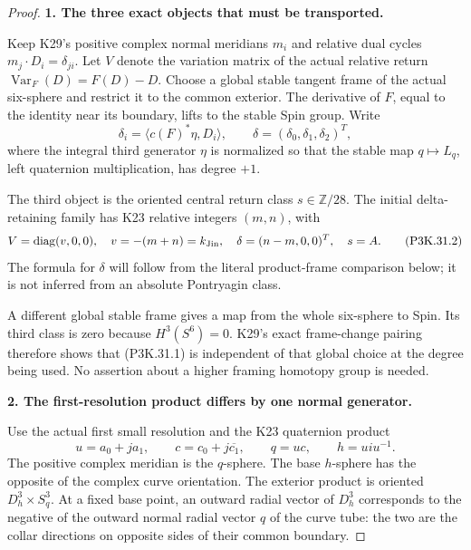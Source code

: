 \begin{proof}
\par\medskip\noindent\textbf{1. The three exact objects that must be transported.}\enspace

Keep K29's positive complex normal meridians \(m_i\) and relative
dual cycles \(m_j\cdot D_i=\delta_{ji}\). Let \(V\) denote the
variation matrix of the actual relative return
\(\operatorname{Var}_F(D)=F(D)-D\). Choose a global stable tangent
frame of the actual six-sphere and restrict it to the common exterior.
The derivative of \(F\), equal to the identity near its boundary,
lifts to the stable Spin group. Write
\[
 \delta_i=\langle c(F)^*\eta,D_i\rangle,\qquad
       \delta=(\delta_0,\delta_1,\delta_2)^T,
                                                        \tag{P3K.31.1}
\]
where the integral third generator \(\eta\) is normalized so that
the stable map \(q\mapsto L_q\), left quaternion multiplication,
has degree \(+1\).

The third object is the oriented central return class \(s\in\mathbb Z/28\).
The initial delta-retaining family has K23 relative integers
\((m,n)\), with
\[
       V=\operatorname{diag}(v,0,0),\quad
       v=-(m+n)=k_{\rm Jin},\quad
       \delta=(n-m,0,0)^T,\quad s=A.
                                                        \tag{P3K.31.2}
\]
The formula for \(\delta\) will follow from the literal product-frame
comparison below; it is not inferred from an absolute Pontryagin class.

A different global stable frame gives a map from the whole six-sphere
to Spin. Its third class is zero because \(H^3(S^6)=0\).
K29's exact frame-change pairing therefore shows that (P3K.31.1) is
independent of that global choice at the degree being used.
No assertion about a higher framing homotopy group is needed.

\par\medskip\noindent\textbf{2. The first-resolution product differs by one normal generator.}\enspace

Use the actual first small resolution and the K23 quaternion product
\[
 u=a_0+j a_1,\qquad
 c=c_0+j\overline{c_1},\qquad
 q=uc,\qquad h=u i u^{-1}.
                                                        \tag{P3K.31.3}
\]
The positive complex meridian is the \(q\)-sphere. The base
\(h\)-sphere has the opposite of the complex curve orientation.
The exterior product is oriented \(D^3_h\times S^3_q\).
At a fixed base point, an outward radial vector of \(D^3_h\)
corresponds to the negative of the outward normal radial
vector \(q\) of the curve tube: the two are the collar
directions on opposite sides of their common boundary.


\end{proof}
